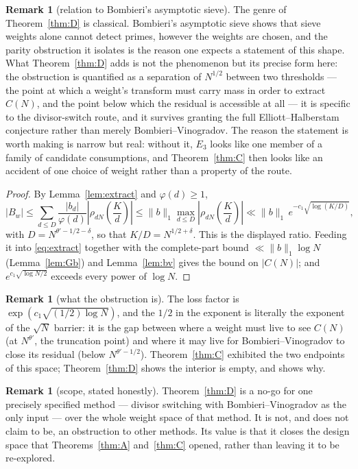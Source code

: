 \documentclass[11pt,a4paper]{article}
\theoremstyle{plain}
\theoremstyle{definition}
\newtheorem{remark}[theorem]{Remark}
\begin{document}
\begin{remark}[relation to Bombieri's asymptotic sieve]
\label{rem:bombieri}
The genre of Theorem~\ref{thm:D} is classical. Bombieri's asymptotic
sieve \cite{Bom76} shows that sieve weights alone cannot detect primes,
however the weights are chosen, and the parity obstruction it isolates
is the reason one expects a statement of this shape. What
Theorem~\ref{thm:D} adds is not the phenomenon but its precise form
here: the obstruction is quantified as a separation of $N^{1/2}$ between
two thresholds --- the point at which a weight's transform must carry
mass in order to extract $C(N)$, and the point below which the residual
is accessible at all --- it is specific to the divisor-switch route, and
it survives granting the full Elliott--Halberstam conjecture rather than
merely Bombieri--Vinogradov. The reason the statement is worth making is
narrow but real: without it, $E_3$ looks like one member of a family of
candidate consumptions, and Theorem~\ref{thm:C} then looks like an
accident of one choice of weight rather than a property of the route.
\end{remark}

\begin{proof}
By Lemma~\ref{lem:extract} and $\varphi(d)\ge1$,
\[
  |B_w| \le \sum_{d\le D}\frac{|b_d|}{\varphi(d)}
    \left|\rho_{dN}\!\left(\frac Kd\right)\right|
  \le \|b\|_1\max_{d\le D}\left|\rho_{dN}\!\left(\frac Kd\right)\right|
  \ll \|b\|_1\,e^{-c_1\sqrt{\log(K/D)}},
\]
with $D=N^{\theta'-1/2-\delta}$, so that
$K/D=N^{1/2+\delta}$. This is the displayed ratio. Feeding it into
\eqref{eq:extract} together with the complete-part bound
$\ll\|b\|_1\log N$ (Lemma~\ref{lem:Gb}) and Lemma~\ref{lem:bv} gives
the bound on $|C(N)|$; and $e^{c_1\sqrt{\log N/2}}$ exceeds every
power of $\log N$.
\end{proof}

\begin{remark}[what the obstruction is]
The loss factor is $\exp(c_1\sqrt{(1/2)\log N})$, and the $1/2$ in the
exponent is literally the exponent of the $\sqrt N$ barrier: it is the
gap between where a weight must live to see $C(N)$ (at $N^{\theta'}$,
the truncation point) and where it may live for Bombieri--Vinogradov
to close its residual (below $N^{\theta'-1/2}$). Theorem~\ref{thm:C}
exhibited the two endpoints of this space; Theorem~\ref{thm:D} shows
the interior is empty, and shows why.
\end{remark}

\begin{remark}[scope, stated honestly]
Theorem~\ref{thm:D} is a no-go for one precisely specified method ---
divisor switching with Bombieri--Vinogradov as the only input --- over
the whole weight space of that method. It is not, and does not claim
to be, an obstruction to other methods. Its value is that it closes
the design space that Theorems~\ref{thm:A} and~\ref{thm:C} opened,
rather than leaving it to be re-explored.
\end{remark}
\end{document}
